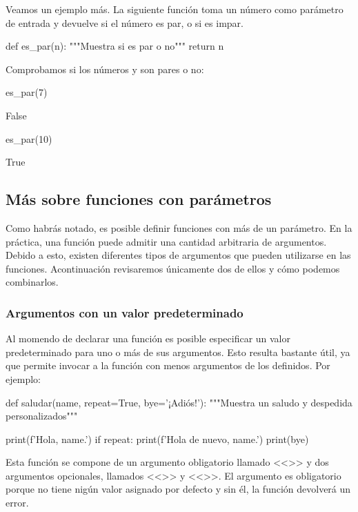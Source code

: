 Veamos un ejemplo más. La siguiente función toma un número como parámetro de entrada y devuelve  si el número es par, o  si es impar.

\begin{pyin}
def es_par(n):
    """Muestra si es par o no"""
    return n %
\end{pyin}

Comprobamos si los números  y  son pares o no:
\begin{pyin}
es_par(7)
\end{pyin}
\begin{pyout}
False
\end{pyout}

\begin{pyin}
es_par(10)
\end{pyin}
\begin{pyout}
True
\end{pyout}

\subsection{Más sobre funciones con parámetros}
Como habrás notado, es posible definir funciones con más de un parámetro. En la práctica, una función puede admitir una cantidad arbitraria de argumentos. Debido a esto, existen diferentes tipos de argumentos que pueden utilizarse en las funciones. Acontinuación revisaremos únicamente dos de ellos y cómo podemos combinarlos.

\subsubsection{Argumentos con un valor predeterminado}
Al momendo de declarar una función es posible especificar un valor predeterminado para uno o más de sus argumentos. Esto resulta bastante útil, ya que permite invocar a la función con menos argumentos de los definidos. Por ejemplo:

\begin{pyin}
def saludar(name, repeat=True, bye='¡Adiós!'):
    """Muestra un saludo y despedida personalizados"""

    print(f'Hola, {name}.')
    if repeat:
        print(f'Hola de nuevo, {name}.')
    print(bye)
\end{pyin}

Esta función se compone de un argumento obligatorio llamado <<>> y dos argumentos opcionales, llamados <<>> y <<>>. El argumento  es obligatorio porque no tiene nigún valor asignado por defecto y sin él, la función devolverá un error. 

